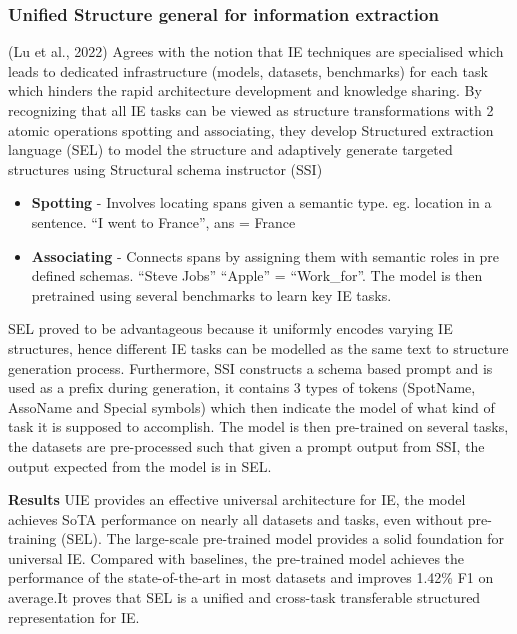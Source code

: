 \documentclass[twocolumn, 11pt]{extarticle}
\begin{document}
\subsubsection{Unified Structure general for information extraction}
(Lu et al., 2022) Agrees with the notion that IE techniques are specialised which leads to dedicated infrastructure (models, datasets, benchmarks) for each task which hinders the rapid architecture development and knowledge sharing. 
By recognizing that all IE tasks can be viewed as structure transformations with 2 atomic operations spotting and associating, they develop Structured extraction language (SEL) to model the structure and adaptively generate targeted structures using Structural schema instructor (SSI)
 \begin{itemize}
     \item \textbf{Spotting} - Involves locating spans given a semantic type. eg. location in a sentence. “I went to France”, ans = France
     \item \textbf{Associating} - Connects spans by assigning them with semantic roles in pre defined schemas. “Steve Jobs” “Apple” = “Work\_for”. The model is then pretrained using several benchmarks to learn key IE tasks.
 \end{itemize}

SEL proved to be advantageous because it uniformly encodes varying IE structures, hence different IE tasks can be modelled as the same text to structure generation process. 
Furthermore, SSI constructs a schema based prompt and is used as a prefix during generation, it contains 3 types of tokens (SpotName, AssoName and Special symbols) which then indicate the model of what kind of task it is supposed to accomplish. 
The model is then pre-trained on several tasks, the datasets are pre-processed such that given a prompt output from SSI, the output expected from the model is in SEL. 

\textbf{Results}
UIE provides an effective universal architecture for IE, the model achieves SoTA performance on nearly all datasets and tasks, even without pre-training (SEL).
The large-scale pre-trained model provides a solid foundation for universal IE. Compared with baselines, the pre-trained model achieves the performance of the state-of-the-art in most datasets and improves 1.42\% F1 on average.It proves that SEL is a unified and cross-task transferable structured representation for IE. 
\end{document}
